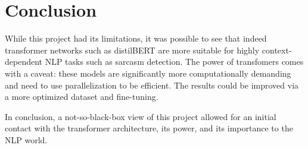 \thispagestyle{plain}

\section{Conclusion}

While this project had its limitations, it was possible to see that indeed transformer networks such as distilBERT are more suitable for highly context-dependent NLP tasks such as sarcasm detection. The power of transfomers comes with a caveat: these models are significantly more computationally demanding and need to use parallelization to be efficient. The results could be improved via a more optimized dataset and fine-tuning.

In conclusion, a not-so-black-box view of this project allowed for an initial contact with the transformer architecture, its power, and its importance to the NLP world.